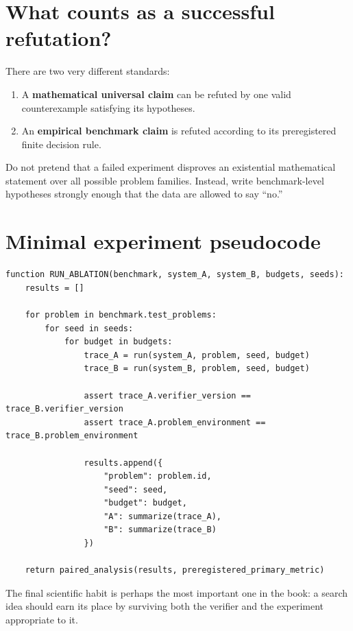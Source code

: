 \documentclass[11pt,openany]{book}
\theoremstyle{definition}
\theoremstyle{remark}
\begin{document}
\section{What counts as a successful refutation?}
There are two very different standards:
\begin{enumerate}
\item A \textbf{mathematical universal claim} can be refuted by one valid counterexample satisfying its hypotheses.
\item An \textbf{empirical benchmark claim} is refuted according to its preregistered finite decision rule.
\end{enumerate}
Do not pretend that a failed experiment disproves an existential mathematical statement over all possible problem families. Instead, write benchmark-level hypotheses strongly enough that the data are allowed to say ``no.''

\section{Minimal experiment pseudocode}
\begin{lstlisting}[style=pseudo,caption={Paired ablation harness for any Lab conjecture}]
function RUN_ABLATION(benchmark, system_A, system_B, budgets, seeds):
    results = []

    for problem in benchmark.test_problems:
        for seed in seeds:
            for budget in budgets:
                trace_A = run(system_A, problem, seed, budget)
                trace_B = run(system_B, problem, seed, budget)

                assert trace_A.verifier_version == trace_B.verifier_version
                assert trace_A.problem_environment == trace_B.problem_environment

                results.append({
                    "problem": problem.id,
                    "seed": seed,
                    "budget": budget,
                    "A": summarize(trace_A),
                    "B": summarize(trace_B)
                })

    return paired_analysis(results, preregistered_primary_metric)
\end{lstlisting}

The final scientific habit is perhaps the most important one in the book: a search idea should earn its place by surviving both the verifier and the experiment appropriate to it.
\end{document}
